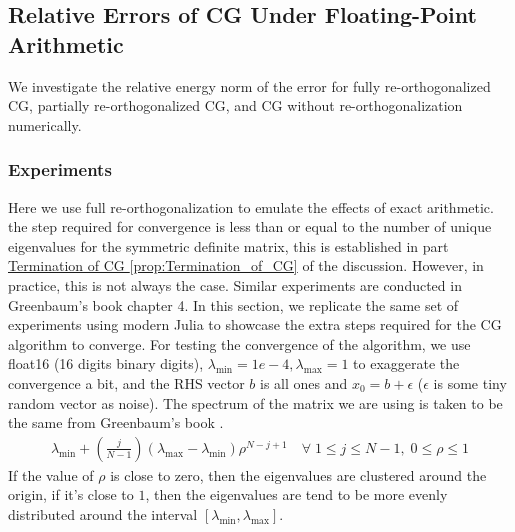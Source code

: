\documentclass[]{article}
\theoremstyle{definition}
\begin{document}
    \subsection{Relative Errors of CG Under Floating-Point Arithmetic}
        We investigate the relative energy norm of the error for fully re-orthogonalized CG, partially re-orthogonalized CG, and CG without re-orthogonalization numerically. 
        \subsubsection{Experiments}
        Here we use full re-orthogonalization to emulate the effects of exact arithmetic. the step required for convergence is less than or equal to the number of unique eigenvalues for the symmetric definite matrix, this is established in part \hyperref[prop:Termination_of_CG]{Termination of CG \ref*{prop:Termination_of_CG}} of the discussion. However, in practice, this is not always the case. Similar experiments are conducted in Greenbaum's book chapter\cite{book:greenbaum} 4. In this section, we replicate the same set of experiments using modern Julia to showcase the extra steps required for the CG algorithm to converge. For testing the convergence of the algorithm, we use float16 (16 digits binary digits), $\lambda_{\min} = 1e-4, \lambda_{\max} = 1$ to exaggerate the convergence a bit, and the RHS vector $b$ is all ones and $x_0 = b + \epsilon$ ($\epsilon$ is some tiny random vector as noise). The spectrum of the matrix we are using is taken to be the same from Greenbaum's book \cite{book:greenbaum}. 
        \begin{align}\label{eqn:paramaterized_experiment_matrix}
            \lambda_{\min} + \left(
                \frac{j}{N - 1}
            \right)(\lambda_{\max} - \lambda_{\min})\rho^{N - j + 1}\quad \forall\; 1 \le j \le N - 1, \; 0 \le \rho \le 1
        \end{align}
        If the value of $\rho$ is close to zero, then the eigenvalues are clustered around the origin, if it's close to $1$, then the eigenvalues are tend to be more evenly distributed around the interval $[\lambda_{\min}, \lambda_{\max}]$. 
\end{document}

